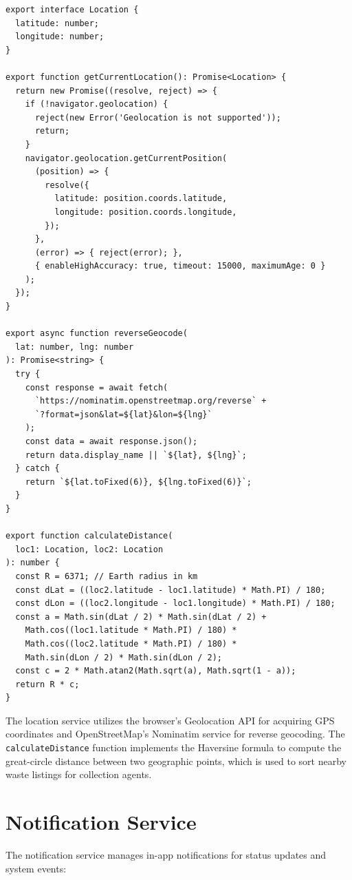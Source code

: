 \documentclass[a4paper,12pt,oneside]{report}
\begin{document}
\begin{lstlisting}[caption={Location Service (location-service.ts)}, label={lst:location}]
export interface Location {
  latitude: number;
  longitude: number;
}

export function getCurrentLocation(): Promise<Location> {
  return new Promise((resolve, reject) => {
    if (!navigator.geolocation) {
      reject(new Error('Geolocation is not supported'));
      return;
    }
    navigator.geolocation.getCurrentPosition(
      (position) => {
        resolve({
          latitude: position.coords.latitude,
          longitude: position.coords.longitude,
        });
      },
      (error) => { reject(error); },
      { enableHighAccuracy: true, timeout: 15000, maximumAge: 0 }
    );
  });
}

export async function reverseGeocode(
  lat: number, lng: number
): Promise<string> {
  try {
    const response = await fetch(
      `https://nominatim.openstreetmap.org/reverse` +
      `?format=json&lat=${lat}&lon=${lng}`
    );
    const data = await response.json();
    return data.display_name || `${lat}, ${lng}`;
  } catch {
    return `${lat.toFixed(6)}, ${lng.toFixed(6)}`;
  }
}

export function calculateDistance(
  loc1: Location, loc2: Location
): number {
  const R = 6371; // Earth radius in km
  const dLat = ((loc2.latitude - loc1.latitude) * Math.PI) / 180;
  const dLon = ((loc2.longitude - loc1.longitude) * Math.PI) / 180;
  const a = Math.sin(dLat / 2) * Math.sin(dLat / 2) +
    Math.cos((loc1.latitude * Math.PI) / 180) *
    Math.cos((loc2.latitude * Math.PI) / 180) *
    Math.sin(dLon / 2) * Math.sin(dLon / 2);
  const c = 2 * Math.atan2(Math.sqrt(a), Math.sqrt(1 - a));
  return R * c;
}
\end{lstlisting}

\noindent The location service utilizes the browser's Geolocation API for acquiring GPS coordinates and OpenStreetMap's Nominatim service for reverse geocoding. The \texttt{calculateDistance} function implements the Haversine formula to compute the great-circle distance between two geographic points, which is used to sort nearby waste listings for collection agents.

\section{Notification Service}

\noindent The notification service manages in-app notifications for status updates and system events:
\end{document}
